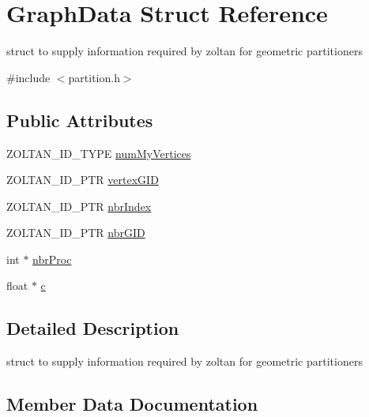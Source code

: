 \hypertarget{structGraphData}{}\section{Graph\+Data Struct Reference}
\label{structGraphData}


struct to supply information required by zoltan for geometric partitioners  




{\ttfamily \#include $<$partition.\+h$>$}

\subsection*{Public Attributes}
\begin{DoxyCompactItemize}
\item 
Z\+O\+L\+T\+A\+N\+\_\+\+I\+D\+\_\+\+T\+Y\+PE \mbox{\hyperlink{structGraphData_a31f99cf2825678b9613e6a5d8dac1888}{num\+My\+Vertices}}
\item 
Z\+O\+L\+T\+A\+N\+\_\+\+I\+D\+\_\+\+P\+TR \mbox{\hyperlink{structGraphData_a145c72abf18fbaf01b69eac638fa8438}{vertex\+G\+ID}}
\item 
Z\+O\+L\+T\+A\+N\+\_\+\+I\+D\+\_\+\+P\+TR \mbox{\hyperlink{structGraphData_acb575a2eec4858a9a3aa11b8e0d4b73f}{nbr\+Index}}
\item 
Z\+O\+L\+T\+A\+N\+\_\+\+I\+D\+\_\+\+P\+TR \mbox{\hyperlink{structGraphData_a7d3d11059af8a40cd597b9323c96c445}{nbr\+G\+ID}}
\item 
int $\ast$ \mbox{\hyperlink{structGraphData_a2c7c5b7763b37451fd58cbab763fed75}{nbr\+Proc}}
\item 
float $\ast$ \mbox{\hyperlink{structGraphData_aaac05eba9859a4c920bb4b219740c103}{c}}
\end{DoxyCompactItemize}


\subsection{Detailed Description}
struct to supply information required by zoltan for geometric partitioners 

\subsection{Member Data Documentation}
\mbox{\label{structGraphData_aaac05eba9859a4c920bb4b219740c103}} 
